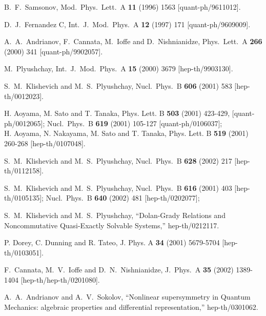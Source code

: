 \documentclass[a4paper,12pt]{article}
\begin{document}
\begin{thebibliography}{99}
B.~F.~Samsonov,
Mod.\ Phys.\ Lett.\ A {\bf 11} (1996) 1563
[quant-ph/9611012].


D.~J.~Fernandez C,
Int.\ J.\ Mod.\ Phys.\ A {\bf 12} (1997) 171
[quant-ph/9609009].

A.~A.~Andrianov, F.~Cannata, M.~Ioffe and D.~Nishnianidze,
Phys.\ Lett.\ A {\bf 266} (2000) 341
[quant-ph/9902057].

M.~Plyushchay,
Int.\ J.\ Mod.\ Phys.\ A {\bf 15} (2000) 3679
[hep-th/9903130].


S.~M.~Klishevich and M.~S.~Plyushchay,
Nucl.\ Phys.\ B {\bf 606} (2001) 583
[hep-th/0012023].


H. Aoyama, M. Sato and T. Tanaka,
Phys. Lett. B {\bf 503} (2001) 423-429,
[quant-ph/0012065];
Nucl.\ Phys.\ B {\bf 619} (2001) 105-127
[quant-ph/0106037];\\
H. Aoyama, N. Nakayama, M. Sato and T. Tanaka,
Phys. Lett. B {\bf 519} (2001) 260-268
[hep-th/0107048].


S.~M.~Klishevich and M.~S.~Plyushchay,
Nucl.\ Phys.\ B {\bf 628} (2002) 217
[hep-th/0112158].


S.~M.~Klishevich and M.~S.~Plyushchay,
Nucl.\ Phys.\ B {\bf 616} (2001) 403
[hep-th/0105135];
Nucl.\ Phys.\ B {\bf 640} (2002) 481
[hep-th/0202077];

S.~M.~Klishevich and M.~S.~Plyushchay,
``Dolan-Grady Relations and Noncommutative Quasi-Exactly
Solvable Systems,''
hep-th/0212117.


P. Dorey, C. Dunning and R. Tateo,
J. Phys. A {\bf 34} (2001) 5679-5704
[hep-th/0103051].


F.~Cannata, M.~V.~Ioffe and D.~N.~Nishnianidze,
J.\ Phys.\ A {\bf 35} (2002) 1389-1404
[hep-th/hep-th/0201080].



A.~A.~Andrianov and A.~V.~Sokolov,
``Nonlinear supersymmetry in Quantum Mechanics:
algebraic properties and differential representation,''
hep-th/0301062.



\end{thebibliography}
\end{document}
